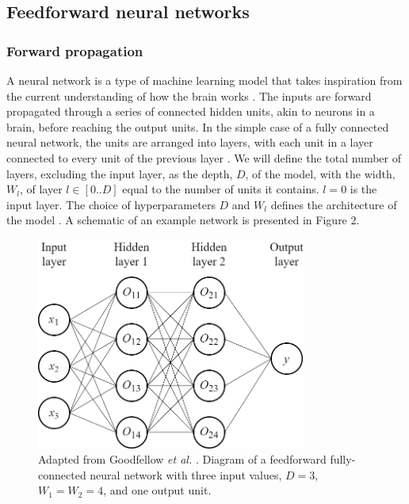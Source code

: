 \documentclass[12pt]{article}
\begin{document}
\subsection{Feedforward neural networks}
\subsubsection{Forward propagation}
A neural network is a type of machine learning model that takes inspiration from the current understanding of how the brain works \cite{Minsky69}. The inputs are forward propagated through a series of connected hidden units, akin to neurons in a brain, before reaching the output units. In the simple case of a fully connected neural network, the units are arranged into layers, with each unit in a layer connected to every unit of the previous layer \cite{Rumelhart86}. We will define the total number of layers, excluding the input layer, as the depth, $D$, of the model, with the width, $W_l$, of layer $l\in[0..D]$ equal to the number of units it contains. $l=0$ is the input layer. The choice of hyperparameters $D$ and $W_l$ defines the architecture of the model \cite{Haykin98}. A schematic of an example network is presented in Figure 2. 

\begin{figure}[!htb]
\centering
\includegraphics[width=3.5in]{images/feedforward_nn.png}
\caption{Adapted from Goodfellow \textit{et al.} \cite{Goodfellow16}. Diagram of a feedforward fully-connected neural network with three input values, $D=3$, $W_1=W_2=4$, and one output unit.}
\end{figure}
\end{document}

